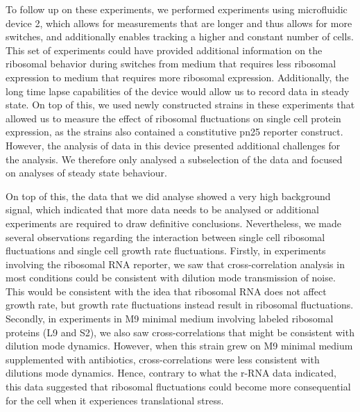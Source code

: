 To follow up on these experiments, we performed experiments using microfluidic device 2, which allows for measurements that are longer and thus allows for more switches, and additionally enables tracking a higher and constant number of cells. 
%
This set of experiments could have provided additional information on the ribosomal behavior during switches from medium that requires less ribosomal expression to medium that requires more ribosomal expression.%
Additionally, the long time lapse capabilities of the device would allow us to record data in steady state.
On top of this, we used newly constructed strains in these experiments that allowed us to measure the effect of ribosomal fluctuations on single cell protein expression, as the strains also contained a constitutive pn25 reporter construct.
%
However, the analysis of data in this device presented additional challenges for the analysis.
%
We therefore only analysed a subselection of the data 
and focused on analyses of steady state behaviour.

On top of this, the data that we did analyse showed a very high background signal, which indicated that 
more data needs to be analysed or additional experiments are required
to draw definitive conclusions.
%
Nevertheless, we made several observations regarding the interaction between single cell ribosomal fluctuations and single cell growth rate fluctuations.
%
Firstly, in experiments involving the ribosomal RNA reporter, we saw that cross-correlation analysis in most conditions could be consistent with dilution mode transmission of noise.
This would be consistent with the idea that ribosomal RNA does not affect growth rate, but growth rate fluctuations instead result in ribosomal fluctuations.
%
Secondly, in experiments in M9 minimal medium involving labeled ribosomal proteins (L9 and S2), we also saw cross-correlations that might be consistent with dilution mode dynamics.
However, when this strain grew on M9 minimal medium supplemented with antibiotics, cross-correlations were less consistent with dilutions mode dynamics.
Hence, contrary to what the r-RNA data indicated, this data suggested that ribosomal fluctuations could become more consequential for the cell when it experiences translational stress.

